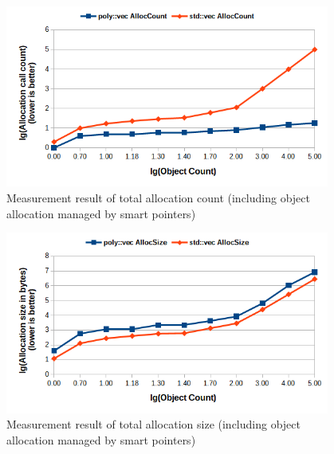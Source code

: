 \documentclass[a4paper,12pt]{article}
\begin{document}
\begin{figure}[!htb]
    \centering
    \includegraphics[width=0.95\textwidth]{alloccount-meas.png}
    \caption{Measurement result of total allocation count (including object allocation managed by smart pointers)}
    \label{fig:meas-alloccount}
\end{figure}
\begin{figure}[!htb]
    \centering
    \includegraphics[width=0.95\textwidth]{allocsize-meas.png}
    \caption{Measurement result of total allocation size (including object allocation managed by smart pointers)}
    \label{fig:meas-allocsize}
\end{figure}
\end{document}
